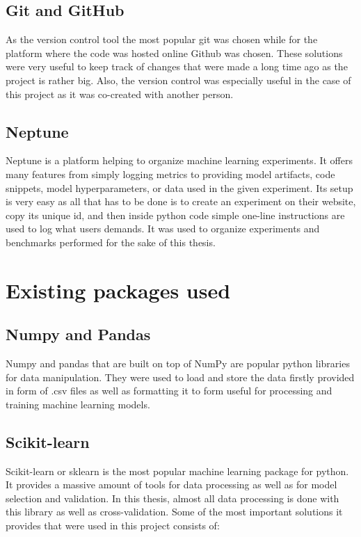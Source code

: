 \documentclass[a4paper,twoside,12pt]{book}
\begin{document}
\subsection{Git and GitHub}

As the version control tool the most popular git was chosen while for the platform where the code was hosted online Github was chosen. These solutions were very useful to keep track of changes that were made a long time ago as the project is rather big. Also, the version control was especially useful in the case of this project as it was co-created with another person.

\subsection{Neptune}

Neptune \cite{bib:Neptune} is a platform helping to organize machine learning experiments. It offers many features from simply logging metrics to providing model artifacts, code snippets, model hyperparameters, or data used in the given experiment. Its setup is very easy as all that has to be done is to create an experiment on their website, copy its unique id, and then inside python code simple one-line instructions are used to log what users demands. It was used to organize experiments and benchmarks performed for the sake of this thesis.


\section{Existing packages used}


\subsection{Numpy and Pandas}

Numpy and pandas that are built on top of NumPy are popular python libraries for data manipulation.
They were used to load and store the data firstly provided in form of .csv files as well as formatting it to form useful for processing and training machine learning models.

\subsection{Scikit-learn}

Scikit-learn or sklearn is the most popular machine learning package for python. It provides a massive amount of tools for data processing as well as for model selection and validation.
In this thesis, almost all data processing is done with this library as well as cross-validation. Some of the most important solutions it provides that were used in this project consists of:
\end{document}
